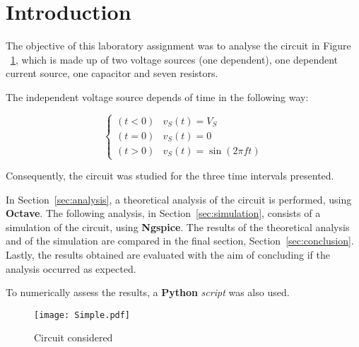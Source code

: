\section{Introduction}
\label{sec:introduction}

The objective of this laboratory assignment was to analyse the circuit in Figure ~\ref{circuit}, which is made up of two voltage sources (one dependent), one dependent current source, one capacitor and seven resistors.

The independent voltage source depends of time in the following way:

\begin{equation}
  \begin{cases}
    (t < 0) & v_S(t) = V_S \\
    (t = 0) & v_S(t) = 0 \\
    (t > 0) & v_S(t) = \sin(2\pi ft)
  \end{cases}
\end{equation}

Consequently, the circuit was studied for the three time intervals presented.

In Section~\ref{sec:analysis}, a theoretical analysis of the circuit is performed, using {\bf Octave}. The following analysis, in Section~\ref{sec:simulation}, consists of a simulation of the circuit, using {\bf Ngspice}. The results of the theoretical analysis and of the simulation are compared in the final section, Section~\ref{sec:conclusion}. Lastly, the results obtained are evaluated with the aim of concluding if the analysis occurred as expected.

To numerically assess the results, a {\bf Python} {\it script} was also used.



\begin{figure}[H]
  \centering
  \texttt{[image: Simple.pdf]}
  \caption{Circuit considered}
  \label{circuit}
\end{figure}

